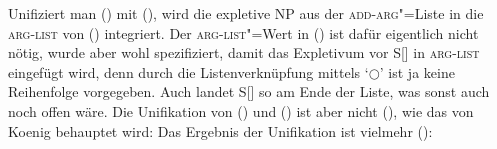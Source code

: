 \ea
\label{linking-extraposition}%
\z
Unifiziert man () mit (), wird die expletive NP aus der \textsc{add-arg}"=Liste
in die \textsc{arg-list} von () integriert. Der \textsc{arg-list}"=Wert in ()
ist dafür eigentlich nicht nötig, wurde aber wohl spezifiziert, damit das Expletivum
vor S[] in \textsc{arg-list} eingefügt wird, denn durch die Listenverknüpfung
mittels `$\bigcirc$' ist ja keine Reihenfolge vorgegeben. Auch landet S[] so am Ende der
Liste, was sonst auch noch offen wäre.
Die Unifikation von () und () ist aber nicht (), wie das von Koenig
behauptet wird:
\ea
{}
\z
Das Ergebnis der Unifikation ist vielmehr ():
\ea
{}

